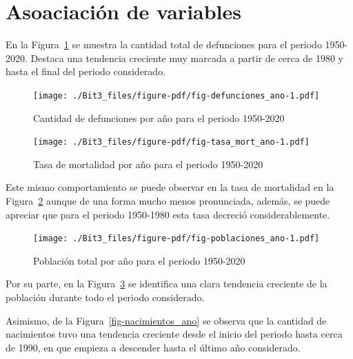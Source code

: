 \documentclass[
  letterpaper,
  onepage,
  openany]{report}
\begin{document}
\hypertarget{asoaciaciuxf3n-de-variables}{%
\section{Asoaciación de variables}\label{asoaciaciuxf3n-de-variables}}

En la Figura~\ref{fig-defunciones_ano} se muestra la cantidad total de
defunciones para el periodo 1950-2020. Destaca una tendencia creciente
muy marcada a partir de cerca de 1980 y hasta el final del periodo
considerado.

\begin{figure}[H]

{\centering \texttt{[image: ./Bit3\_files/figure-pdf/fig-defunciones\_ano-1.pdf]}

}

\caption{\label{fig-defunciones_ano}Cantidad de defunciones por año para
el periodo 1950-2020}

\end{figure}

\begin{figure}[H]

{\centering \texttt{[image: ./Bit3\_files/figure-pdf/fig-tasa\_mort\_ano-1.pdf]}

}

\caption{\label{fig-tasa_mort_ano}Tasa de mortalidad por año para el
periodo 1950-2020}

\end{figure}

Este mismo comportamiento se puede observar en la tasa de mortalidad en
la Figura~\ref{fig-tasa_mort_ano} aunque de una forma mucho menos
pronunciada, además, se puede apreciar que para el periodo 1950-1980
esta tasa decreció considerablemente.

\begin{figure}[H]

{\centering \texttt{[image: ./Bit3\_files/figure-pdf/fig-poblaciones\_ano-1.pdf]}

}

\caption{\label{fig-poblaciones_ano}Población total por año para el
periodo 1950-2020}

\end{figure}

Por su parte, en la Figura~\ref{fig-poblaciones_ano} se identifica una
clara tendencia creciente de la población durante todo el periodo
considerado.

Asimismo, de la Figura~\ref{fig-nacimientos_ano} se observa que la
cantidad de nacimientos tuvo una tendencia creciente desde el inicio del
periodo hasta cerca de 1990, en que empieza a descender hasta el último
año considerado.
\end{document}
